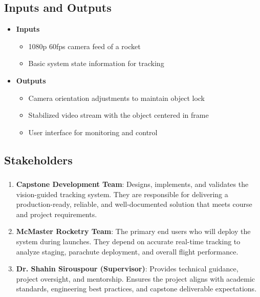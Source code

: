 \documentclass{article}
\begin{document}
\subsection{Inputs and Outputs}
\begin{itemize}
    \item \textbf{Inputs}
    \begin{itemize}
        \item 1080p 60fps camera feed of a rocket
        \item Basic system state information for tracking
    \end{itemize}

    \item \textbf{Outputs}
    \begin{itemize}
        \item Camera orientation adjustments to maintain object lock
        \item Stabilized video stream with the object centered in frame
        \item User interface for monitoring and control
    \end{itemize}
\end{itemize}


\subsection{Stakeholders}

\subsubsection*{\color{blue}{Direct Stakeholders}}
\begin{enumerate}
    \item \textbf{Capstone Development Team}: Designs, implements, and validates the vision-guided tracking system. They are responsible for delivering a production-ready, reliable, and well-documented solution that meets course and project requirements.  

    \item \textbf{McMaster Rocketry Team}: The primary end users who will deploy the system during launches. They depend on accurate real-time tracking to analyze staging, parachute deployment, and overall flight performance.  

    \item \textbf{Dr. Shahin Sirouspour (Supervisor)}: Provides technical guidance, project oversight, and mentorship. Ensures the project aligns with academic standards, engineering best practices, and capstone deliverable expectations.  
\end{enumerate}
\end{document}

